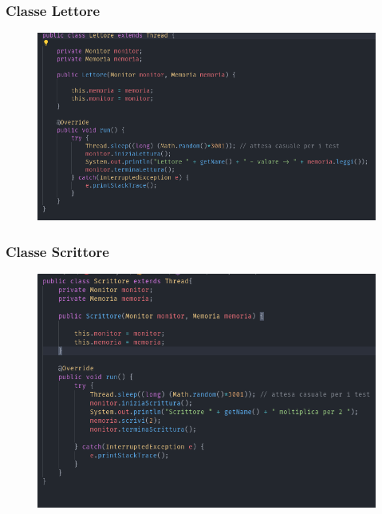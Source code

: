 \documentclass[10pt]{beamer}
\begin{document}
\begin{frame}
	\frametitle{Classe Lettore}
		\begin{figure}
			\centering
			\includegraphics[width=\linewidth]{img/lettore_java}
		\end{figure}
\end{frame}
\begin{frame}
	\frametitle{Classe Scrittore}
	\begin{figure}
		\centering
		\includegraphics[width=\linewidth]{img/scrittore_java}
	\end{figure}
\end{frame}
\end{document}
